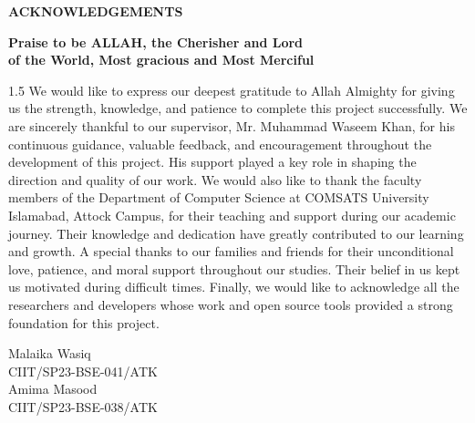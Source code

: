 \documentclass[A4paper,12pt]{report}
\theoremstyle{plain}
\theoremstyle{definition}
\theoremstyle{remark}
\numberwithin{equation}{section}
\begin{document}
\newpage
\begin{center}
\Large\textbf{{ACKNOWLEDGEMENTS}}\\
\end{center}
\vspace{0.2in}
\begin{center}
\textbf{Praise to be ALLAH, the Cherisher and Lord\\of the World, Most gracious and Most Merciful}
\end{center}
\vspace{0.2in}
\begin{spacing}{1.5}
\justify\noindent \normalsize{We would like to express our deepest gratitude to Allah Almighty for giving us the strength, knowledge, and patience to complete this project successfully. We are sincerely thankful to our supervisor, Mr. Muhammad Waseem Khan, for his continuous guidance, valuable feedback, and encouragement throughout the development of this project. His support played a key role in shaping the direction and quality of our work. We would also like to thank the faculty members of the Department of Computer Science at COMSATS University Islamabad, Attock Campus, for their teaching and support during our academic journey. Their knowledge and dedication have greatly contributed to our learning and growth. A special thanks to our families and friends for their unconditional love, patience, and moral support throughout our studies. Their belief in us kept us motivated during difficult times. Finally, we would like to acknowledge all the researchers and developers whose work and open source tools provided a strong foundation for this project.}

\begin{flushright}
\vspace{0.4in}
Malaika Wasiq\\
CIIT/SP23-BSE-041/ATK\\[0.15in]
Amima Masood\\
CIIT/SP23-BSE-038/ATK
\end{flushright}
\end{spacing}
\end{document}
